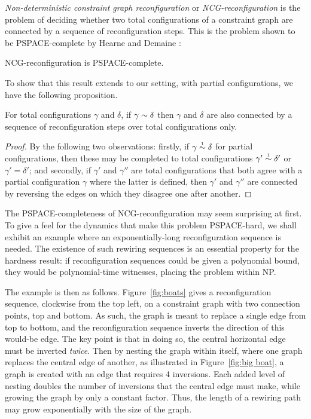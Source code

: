 \documentclass{lmcs}
\let\capsabbrev=\uppercase
\begin{document}
\emph{Non-deterministic constraint graph reconfiguration} or \emph{\capsabbrev{ncg}-reconfiguration} is the problem of deciding whether two total configurations of a constraint graph are connected by a sequence of reconfiguration steps. This is the problem shown to be \capsabbrev{pspace}-complete by Hearne and Demaine \cite{GamesPuzzlesAndComputation}:

\begin{theorem}
\capsabbrev{ncg}-reconfiguration is \capsabbrev{pspace}-complete.
\end{theorem}

To show that this result extends to our setting, with partial configurations, we have the following proposition.

\begin{proposition}
\label{prop:partial simulates total reconfiguration}
For total configurations $\gamma$ and $\delta$, if $\gamma\perm\delta$ then $\gamma$ and $\delta$ are also connected by a sequence of reconfiguration steps over total configurations only.
\end{proposition}

\begin{proof}
By the following two observations: firstly, 
%
if $\gamma\perm*\delta$ for partial configurations, then these may be completed to total configurations $\gamma'\perm*\delta'$ or $\gamma'=\delta'$; and secondly,
%
if $\gamma'$ and $\gamma''$ are total configurations that both agree with a partial configuration $\gamma$ where the latter is defined, then $\gamma'$ and $\gamma''$ are connected by reversing the edges on which they disagree one after another.
%
\end{proof}

The \capsabbrev{pspace}-completeness of \capsabbrev{ncg}-reconfiguration may seem surprising at first. To give a feel for the dynamics that make this problem \capsabbrev{pspace}-hard, we shall exhibit an example where an exponentially-long reconfiguration sequence is needed. The existence of such rewiring sequences is an essential property for the hardness result: if reconfiguration sequences could be given a polynomial bound, they would be polynomial-time witnesses, placing the problem within NP.

The example is then as follows. Figure~\ref{fig:boats} gives a reconfiguration sequence, clockwise from the top left, on a constraint graph with two connection points, top and bottom. As such, the graph is meant to replace a single edge from top to bottom, and the reconfiguration sequence inverts the direction of this would-be edge. The key point is that in doing so, the central horizontal edge must be inverted \emph{twice}. Then by nesting the graph within itself, where one graph replaces the central edge of another, as illustrated in Figure~\ref{fig:big boat}, a graph is created with an edge that requires 4 inversions. Each added level of nesting doubles the number of inversions that the central edge must make, while growing the graph by only a constant factor. Thus, the length of a rewiring path may grow exponentially with the size of the graph.
\end{document}
